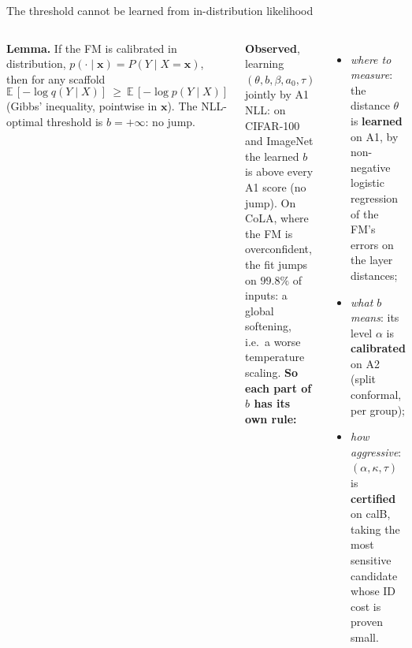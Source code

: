 \documentclass[aspectratio=169,11pt]{beamer}
\newcommand{\E}{\mathbb{E}}
\newcommand{\x}{\bm{x}}
\begin{document}
\begin{frame}{The threshold cannot be learned from in-distribution likelihood}
  \begin{columns}[T,onlytextwidth]
    \small
    \textbf{Lemma.} If the FM is calibrated in distribution, $p(\cdot\mid\x)=P(Y\mid X=\x)$, then for any scaffold
    \[ \E\,[-\log q(Y\mid X)]\ \ge\ \E\,[-\log p(Y\mid X)] \]
    (Gibbs' inequality, pointwise in $\x$). The NLL-optimal threshold is $b=+\infty$: no jump.
    \medskip

    \textbf{Observed}, learning $(\theta,b,\beta,a_0,\tau)$ jointly by A1 NLL: on CIFAR-100 and ImageNet the learned $b$ is above every A1 score (no jump). On CoLA, where the FM is overconfident, the fit jumps on $99.8\%$ of inputs: a global softening, i.e.\ a worse temperature scaling.
    \small
    \textbf{So each part of $b$ has its own rule:}
    \begin{itemize}
      \item \emph{where to measure}: the distance $\theta$ is \textbf{learned} on A1, by non-negative logistic regression of the FM's errors on the layer distances;
      \item \emph{what $b$ means}: its level $\alpha$ is \textbf{calibrated} on A2 (split conformal, per group);
      \item \emph{how aggressive}: $(\alpha,\kappa,\tau)$ is \textbf{certified} on calB, taking the most sensitive candidate whose ID cost is proven small.
    \end{itemize}
  \end{columns}
\end{frame}
\end{document}
